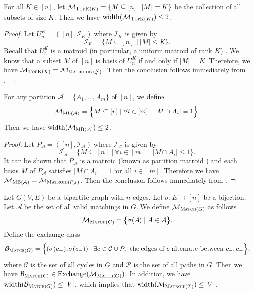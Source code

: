 \documentclass{article}
\newcommand{\M}{\mathcal M}
\newcommand{\B}{\mathcal B}
\DeclareMathOperator{\rank}{width}
\DeclareMathOperator{\Exchange}{Exchange}
\newcommand{\MultiIdent}{\textsc{TopK}\xspace}
\newcommand{\MultiBandit}{\textsc{MB}\xspace}
\newcommand{\Matroid}{\textsc{Matroid}\xspace}
\newcommand{\Match}{\textsc{Match}\xspace}
\begin{document}
\begin{fact}[\MultiIdent]
\label{fact:topk}
For all $K \in [n]$, let $\M_{\MultiIdent(K)} = \{M\subseteq [n] \mid |M| = K\}$ be the collection of all subsets of size $K$.
Then we have $\rank(\M_{\MultiIdent(K)}) \le 2$.
\end{fact}
\begin{proof}
Let $U_n^K = ([n], \mathcal I_{K})$ where $\mathcal I_K$ is given by
$$
\mathcal I_K = \big\{M\subseteq[n] \mid |M| \le K\}.
$$
Recall that $U_n^K$ is a matroid (in particular, a uniform matroid of rank $K$) \citep{oxley2006matroid}.
We know that a subset $M$ of $[n]$ is basis of $U_n^K$ if and only if $|M|=K$.
Therefore, we have $\M_{\MultiIdent(K)}=\M_{\Matroid(U_n^K)}$. 
Then the conclusion follows immediately from .
\end{proof}


\begin{fact}[\MultiBandit]
\label{fact:multibandit}
For any partition $\mathcal A =\{A_1,\ldots,A_m\}$ of $[n]$, we define
$$\M_{\MultiBandit(\mathcal A)} = \Big\{M\subseteq [n] \mid \forall i\in[m] \quad |M\cap A_i| = 1\Big\}.$$
Then we have $\rank(\M_{\MultiBandit(\mathcal A)}) \le 2$.
\end{fact}

\begin{proof}
Let $P_{\mathcal A}=([n], \mathcal I_{\mathcal A})$ where $\mathcal I_{\mathcal A}$ is given by
$$
\mathcal I_{\mathcal A} = \big\{M \subseteq [n] \mid \forall i\in[m] \quad |M\cap A_i| \le 1 \big\}.
$$
It can be shown that $P_{\mathcal A}$ is a matroid (known as partition matroid \citep{oxley2006matroid}) and each basis $M$ of $P_{\mathcal A}$
satisfies $|M\cap A_i| = 1$ for all $i\in [m]$.
Therefore we have $\M_{\MultiBandit(\mathcal A)}=\M_{\Matroid(P_{\mathcal A})}$. 
Then the conclusion follows immediately from .
\end{proof}


\begin{fact}[Matching]
\label{fact:match}
Let $G(V,E)$ be a bipartite graph with $n$ edges.
Let $\sigma\colon E\rightarrow [n]$ be a bijection.
Let $\mathcal A$ be the set of all valid matchings in $G$. 
We define $\M_{\Match(G)}$ as follows
$$
\M_{\Match(G)} = \big\{\sigma(A) \mid A\in\mathcal A \big\}.
$$
Define the exchange class
$$
\B_{\Match(G)} = \Big\{(\sigma(c_+),\sigma(c_-)) \mid \exists c\in \mathcal C\cup \mathcal P,\; \text{the edges of }c\text{ alternate between } c_+,c_-\Big\},
$$
where $\mathcal C$ is the set of all cycles in $G$ and $\mathcal P$ is the set of all paths in $G$.
Then we have $\B_{\Match(G)} \in \Exchange(\M_{\Match(G)})$. 
In addition, we have $\rank(\B_{\Match(G)}) \le |V|$, which implies that $\rank(\M_{\Matroid(T)}) \le |V|$. 
\end{fact}
\end{document}
